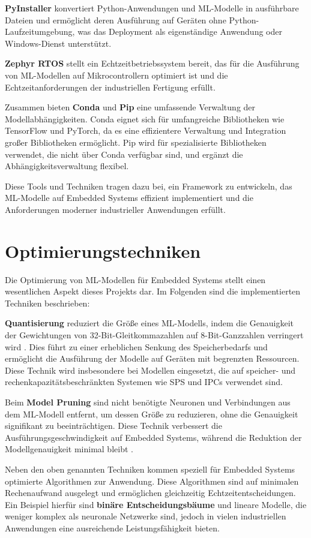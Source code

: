 \textbf{PyInstaller} konvertiert Python-Anwendungen und ML-Modelle in ausführbare Dateien und ermöglicht deren Ausführung auf Geräten ohne Python-Laufzeitumgebung, was das Deployment als eigenständige Anwendung oder Windows-Dienst unterstützt.

\textbf{Zephyr RTOS} stellt ein Echtzeitbetriebssystem bereit, das für die Ausführung von ML-Modellen auf Mikrocontrollern optimiert ist und die Echtzeitanforderungen der industriellen Fertigung erfüllt.

Zusammen bieten \textbf{Conda} und \textbf{Pip} eine umfassende Verwaltung der Modellabhängigkeiten. Conda eignet sich für umfangreiche Bibliotheken wie TensorFlow und PyTorch, da es eine effizientere Verwaltung und Integration großer Bibliotheken ermöglicht. Pip wird für spezialisierte Bibliotheken verwendet, die nicht über Conda verfügbar sind, und ergänzt die Abhängigkeitsverwaltung flexibel.

Diese Tools und Techniken tragen dazu bei, ein Framework zu entwickeln, das ML-Modelle auf Embedded Systems effizient implementiert und die Anforderungen moderner industrieller Anwendungen erfüllt.

\section{Optimierungstechniken}

Die Optimierung von ML-Modellen für Embedded Systems stellt einen wesentlichen Aspekt dieses Projekts dar. Im Folgenden sind die implementierten Techniken beschrieben:

\textbf{Quantisierung} reduziert die Größe eines ML-Modells, indem die Genauigkeit der Gewichtungen von 32-Bit-Gleitkommazahlen auf 8-Bit-Ganzzahlen verringert wird \cite{9919465}. 
Dies führt zu einer erheblichen Senkung des Speicherbedarfs und ermöglicht die Ausführung der Modelle auf Geräten mit begrenzten Ressourcen. Diese Technik wird insbesondere bei 
Modellen eingesetzt, die auf speicher- und rechenkapazitätsbeschränkten Systemen wie SPS und IPCs verwendet sind.


Beim \textbf{Model Pruning} sind nicht benötigte Neuronen und Verbindungen aus dem ML-Modell entfernt, um dessen Größe zu reduzieren, ohne die Genauigkeit signifikant zu beeinträchtigen. 
Diese Technik verbessert die Ausführungsgeschwindigkeit auf Embedded Systems, während die Reduktion der Modellgenauigkeit minimal bleibt \cite{10.1145/3664647.3681449}.

Neben den oben genannten Techniken kommen speziell für Embedded Systems optimierte Algorithmen zur Anwendung. Diese Algorithmen sind auf minimalen Rechenaufwand ausgelegt 
und ermöglichen gleichzeitig Echtzeitentscheidungen. Ein Beispiel hierfür sind \textbf{binäre Entscheidungsbäume} und lineare Modelle, die weniger komplex als neuronale Netzwerke sind, 
jedoch in vielen industriellen Anwendungen eine ausreichende Leistungsfähigkeit bieten.

